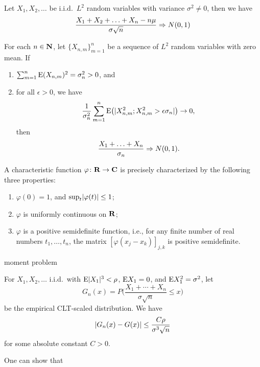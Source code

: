 \begin{namedthm}
    Let $X_1,X_2,\dotsc$ be i.i.d.\ $L^2$ random variables with variance $\sigma^2 \neq 0$, then we have\[
        \frac{X_1 + X_2 + \dotsc + X_n - n \mu}{\sigma \sqrt{n}} \Rightarrow N(0,1)
    \]
\end{namedthm}

\begin{namedthm}
    For each $n \in \mathbf{N}$, let $\{X_{n,m}\}_{m=1}^n$ be a sequence of $L^2$ random variables with zero mean. If \begin{enumerate}
        \item $\sum_{m=1}^n \mathop{}\!\mathrm{E} (X_{n,m})^2 = \sigma_n^2 > 0$, and 
        \item for all $\epsilon > 0$, we have \[
            \frac{1}{\sigma_n^2} \sum_{m=1}^n \mathop{}\!\mathrm{E}\bigl(\lvert X_{n,m}^2; X_{n,m}^2 > \epsilon \sigma_n \rvert\bigr) \to 0,
        \] then \[
            \frac{X_1 + \dotsc + X_n}{\sigma_n} \Rightarrow N(0,1).
        \]
    \end{enumerate}
\end{namedthm}

\begin{namedthm}
    
\end{namedthm}

\begin{namedthm}
    A characteristic function $\varphi\colon \mathbf{R} \to \mathbf{C}$ is precisely characterized by the following three properties: \begin{enumerate}
        \item $\varphi(0) = 1$, and $\sup_{t}\lvert \varphi(t) \rvert \leq 1$;
        \item $\varphi$ is uniformly continuous on $\mathbf{R}$;
        \item $\varphi$ is a positive semidefinite function, i.e., for any finite number of real numbers $t_1,\dotsc,t_n$, the matrix $[\varphi(x_j - x_k)]_{j,k}$ is positive semidefinite.
    \end{enumerate}
\end{namedthm}


moment problem

\begin{namedthm}
    For $X_1,X_2,\dotsc$ i.i.d.\ with $\mathop{}\!\mathrm{E} \lvert X_1 \rvert^3 < \rho$, $\mathop{}\!\mathrm{E} X_1 = 0$, and $\mathop{}\!\mathrm{E} X_1^2 = \sigma^2$, let \[
        G_n(x) = P\biggl( \frac{X_1 + \dotsb + X_n}{\sigma\sqrt n} \leq x\biggr)
    \] be the empirical CLT-scaled distribution. We have \[
        \lvert G_n(x) - G(x) \rvert \leq \frac{C\rho}{\sigma^3 \sqrt n}
    \] for some absolute constant $C > 0$.

    One can show that 
\end{namedthm}

